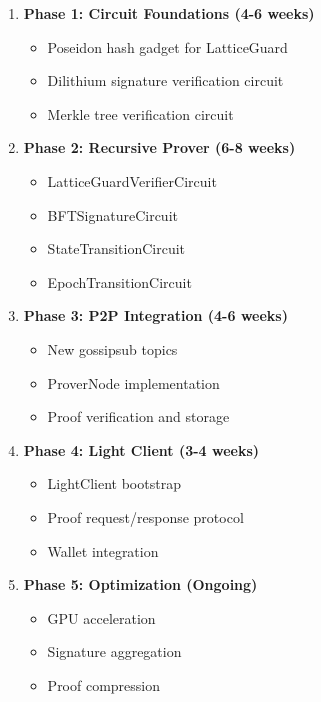\documentclass[11pt,a4paper]{article}
\begin{document}
\begin{enumerate}
    \item \textbf{Phase 1: Circuit Foundations (4-6 weeks)}
    \begin{itemize}
        \item Poseidon hash gadget for LatticeGuard
        \item Dilithium signature verification circuit
        \item Merkle tree verification circuit
    \end{itemize}

    \item \textbf{Phase 2: Recursive Prover (6-8 weeks)}
    \begin{itemize}
        \item LatticeGuardVerifierCircuit
        \item BFTSignatureCircuit
        \item StateTransitionCircuit
        \item EpochTransitionCircuit
    \end{itemize}

    \item \textbf{Phase 3: P2P Integration (4-6 weeks)}
    \begin{itemize}
        \item New gossipsub topics
        \item ProverNode implementation
        \item Proof verification and storage
    \end{itemize}

    \item \textbf{Phase 4: Light Client (3-4 weeks)}
    \begin{itemize}
        \item LightClient bootstrap
        \item Proof request/response protocol
        \item Wallet integration
    \end{itemize}

    \item \textbf{Phase 5: Optimization (Ongoing)}
    \begin{itemize}
        \item GPU acceleration
        \item Signature aggregation
        \item Proof compression
    \end{itemize}
\end{enumerate}
\end{document}
